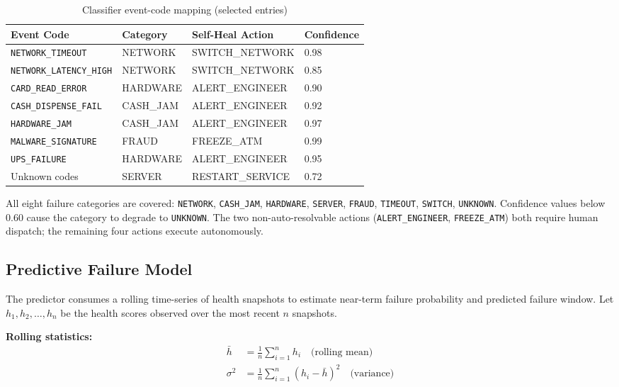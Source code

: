 \documentclass[11pt,a4paper]{article}
\begin{document}
\begin{table}[H]
\centering
\small
\caption{Classifier event-code mapping (selected entries)}
\label{tab:classifier}
\begin{tabular}{@{}llll@{}}
\toprule
\textbf{Event Code} & \textbf{Category} & \textbf{Self-Heal Action} & \textbf{Confidence} \\
\midrule
\texttt{NETWORK\_TIMEOUT}      & NETWORK   & SWITCH\_NETWORK    & 0.98 \\
\texttt{NETWORK\_LATENCY\_HIGH} & NETWORK  & SWITCH\_NETWORK    & 0.85 \\
\texttt{CARD\_READ\_ERROR}     & HARDWARE  & ALERT\_ENGINEER    & 0.90 \\
\texttt{CASH\_DISPENSE\_FAIL}  & CASH\_JAM & ALERT\_ENGINEER    & 0.92 \\
\texttt{HARDWARE\_JAM}         & CASH\_JAM & ALERT\_ENGINEER    & 0.97 \\
\texttt{MALWARE\_SIGNATURE}    & FRAUD     & FREEZE\_ATM        & 0.99 \\
\texttt{UPS\_FAILURE}          & HARDWARE  & ALERT\_ENGINEER    & 0.95 \\
Unknown codes                  & SERVER    & RESTART\_SERVICE   & 0.72 \\
\bottomrule
\end{tabular}
\end{table}

All eight failure categories are covered: \texttt{NETWORK}, \texttt{CASH\_JAM}, \texttt{HARDWARE}, \texttt{SERVER}, \texttt{FRAUD}, \texttt{TIMEOUT}, \texttt{SWITCH}, \texttt{UNKNOWN}. Confidence values below 0.60 cause the category to degrade to \texttt{UNKNOWN}. The two non-auto-resolvable actions (\texttt{ALERT\_ENGINEER}, \texttt{FREEZE\_ATM}) both require human dispatch; the remaining four actions execute autonomously.

\subsection{Predictive Failure Model}

The predictor consumes a rolling time-series of health snapshots to estimate near-term failure probability and predicted failure window. Let $h_1, h_2, \ldots, h_n$ be the health scores observed over the most recent $n$ snapshots.

\textbf{Rolling statistics:}
\begin{align}
  \bar{h} &= \frac{1}{n}\sum_{i=1}^{n} h_i \quad\text{(rolling mean)} \\[4pt]
  \sigma^2 &= \frac{1}{n}\sum_{i=1}^{n}(h_i - \bar{h})^2 \quad\text{(variance)}
\end{align}
\end{document}
